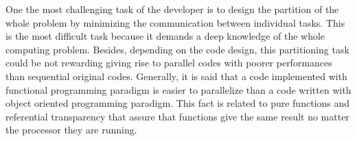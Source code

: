 One the most challenging task of the developer is to design the partition of the 
whole problem by minimizing the communication between individual tasks.  
This is the most difficult task because it demands a deep knowledge of the whole computing 
problem. Besides, depending on the code design, this partitioning task could be not rewarding 
giving rise to parallel codes with poorer performances than sequential original codes. 
Generally, it is said that a code implemented with functional programming paradigm is easier to 
parallelize than a code written with object oriented programming paradigm. 
This fact is related to pure functions and referential transparency that 
assure that functions give the same result no matter the processor they are running. 


               